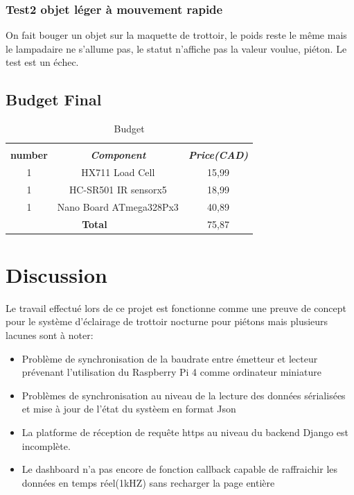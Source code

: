 \documentclass[journal]{IEEEtran}
\begin{document}
\subsubsection{Test2 objet léger à mouvement rapide}
On fait bouger un objet sur la maquette de trottoir, le poids reste le même mais le lampadaire ne s'allume pas, le statut n'affiche pas la valeur voulue, piéton. Le test est un échec.

\subsection{Budget Final}

\begin{table}[htbp]
    \caption{Budget}
    \begin{center}
    \begin{tabular}{|c|c|c|}
    \hline\\
    \textbf{number} & \textbf{\textit{Component}}& \textbf{\textit{Price(CAD)}}\\
    \hline
    1& HX711 Load Cell& 15,99   \\
    \hline
    1&  HC-SR501 IR sensorx5& 18,99\\
    \hline
    1&  Nano Board ATmega328Px3& 40,89\\ 
    \hline
    \multicolumn{2}{|c|}{\textbf{Total}}& 75,87\\
    \end{tabular}
    \label{tab1}
    \end{center}
    \end{table}
    




\section{Discussion}
Le travail effectué lors de ce projet est fonctionne comme une preuve de concept pour le système d'éclairage de trottoir nocturne pour piétons mais plusieurs lacunes sont à noter:
\begin{itemize}
    \item Problème de synchronisation de la baudrate entre émetteur et lecteur prévenant l'utilisation du Raspberry Pi 4 comme ordinateur miniature
    \item Problèmes de synchronisation au niveau de la lecture des données sérialisées et mise à jour de l'état du systèem en format Json
    \item La platforme de réception de requête https au niveau du backend Django est incomplète.
    \item Le dashboard n'a pas encore de fonction callback capable de raffraichir les données en temps réel(1kHZ) sans recharger la page entière  
\end{itemize}
\end{document}
